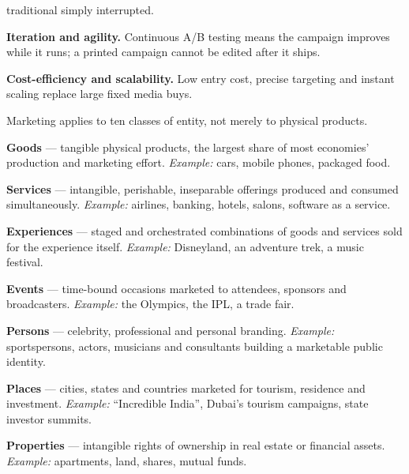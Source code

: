 \begin{qlist}
\begin{apts}
      traditional simply interrupted.
\item \textbf{Iteration and agility.} Continuous A/B testing means the campaign
      improves while it runs; a printed campaign cannot be edited after it
      ships.
\item \textbf{Cost-efficiency and scalability.} Low entry cost, precise
      targeting and instant scaling replace large fixed media buys.
\end{apts}

Marketing applies to ten classes of entity, not merely to physical products.
\begin{apts}
\item \textbf{Goods} --- tangible physical products, the largest share of most
      economies' production and marketing effort. \emph{Example:} cars, mobile
      phones, packaged food.
\item \textbf{Services} --- intangible, perishable, inseparable offerings
      produced and consumed simultaneously. \emph{Example:} airlines, banking,
      hotels, salons, software as a service.
\item \textbf{Experiences} --- staged and orchestrated combinations of goods and
      services sold for the experience itself. \emph{Example:} Disneyland, an
      adventure trek, a music festival.
\item \textbf{Events} --- time-bound occasions marketed to attendees, sponsors
      and broadcasters. \emph{Example:} the Olympics, the IPL, a trade fair.
\item \textbf{Persons} --- celebrity, professional and personal branding.
      \emph{Example:} sportspersons, actors, musicians and consultants building
      a marketable public identity.
\item \textbf{Places} --- cities, states and countries marketed for tourism,
      residence and investment. \emph{Example:} ``Incredible India'', Dubai's
      tourism campaigns, state investor summits.
\item \textbf{Properties} --- intangible rights of ownership in real estate or
      financial assets. \emph{Example:} apartments, land, shares, mutual funds.

\end{apts}
\end{qlist}
